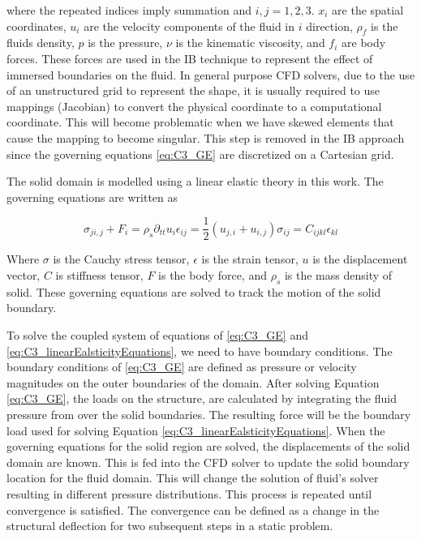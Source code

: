 where the repeated indices imply summation and $i,j=1,2,3$. $x_i$ are the spatial coordinates, $u_i$ are the velocity components of the fluid in $i$ direction, $\rho_f$ is the fluids density, $p$ is the pressure, $\nu$ is the kinematic viscosity, and $f_i$ are body forces. These forces are used in the IB technique to represent the effect of immersed boundaries on the fluid. In general purpose CFD solvers, due to the use of an unstructured grid to represent the shape, it is usually required to use mappings (Jacobian) to convert the physical coordinate to a computational coordinate. This will become problematic when we have skewed elements that cause the mapping to become singular. This step is removed in the IB approach since the governing equations \eqref{eq:C3_GE} are discretized on a Cartesian grid.

The solid domain is modelled using a linear elastic theory in this work. The governing equations are written as

\begin{subequations}\label{eq:C3_linearEalsticityEquations}
\begin{equation}
    \sigma_{ji,j} + F_i = \rho_s \partial_{tt} u_i
\end{equation}
\begin{equation}
    \epsilon_{ij} = \frac{1}{2} \left( u_{j,i} + u_{i,j} \right)
\end{equation}
\begin{equation}
    \sigma_{ij} = C_{ijkl} \epsilon_{kl}
\end{equation}
\end{subequations}

Where $\sigma$ is the Cauchy stress tensor, $\epsilon$ is the strain tensor, $u$ is the displacement vector, $C$ is stiffness tensor, $F$ is the body force, and $\rho_s$ is the mass density of solid. These governing equations are solved to track the motion of the solid boundary. 

To solve the coupled system of equations of \eqref{eq:C3_GE} and \eqref{eq:C3_linearEalsticityEquations}, we need to have boundary conditions. The boundary conditions of \eqref{eq:C3_GE} are defined as pressure or velocity magnitudes on the outer boundaries of the domain. After solving Equation \eqref{eq:C3_GE}, the loads on the structure, are calculated by integrating the fluid pressure from over the solid boundaries. The resulting force will be the boundary load used for solving Equation \eqref{eq:C3_linearEalsticityEquations}. When the governing equations for the solid region are solved, the displacements of the solid domain are known. This is fed into the CFD solver to update the solid boundary location for the fluid domain. This will change the solution of fluid's solver resulting in different pressure distributions. This process is repeated until convergence is satisfied. The convergence can be defined as a change in the structural deflection for two subsequent steps in a static problem.

